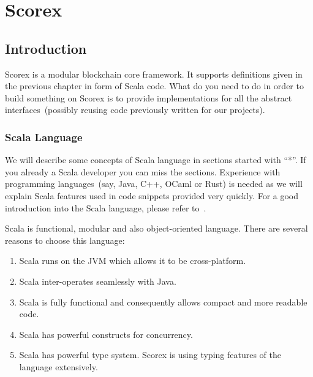 \documentclass[]{report}   %
\begin{document}
%
%
%
%
%

\chapter{Scorex}           
\label{impl}

\section{Introduction}     

Scorex is a modular blockchain core framework. It supports definitions given in the previous chapter in form of Scala code. What do you need to do in order to build something on Scorex is to provide implementations for all the abstract interfaces~(possibly reusing code previously written for our projects).

\subsection{Scala Language}

We will describe some concepts of Scala language in sections started with ``*''. If you already a Scala developer you can miss the sections. Experience with programming languages~(say, Java, C++, OCaml or Rust) is needed as we will explain Scala features used in code snippets provided very quickly. For a good introduction into the Scala language, please refer to~\cite{odersky2008programming}.

Scala is functional, modular and also object-oriented language. There are several reasons to choose this language:
\begin{enumerate}
	\item Scala runs on the JVM which allows it to be cross-platform.
	\item Scala inter-operates seamlessly with Java.
	\item Scala is fully functional and consequently allows compact and more readable code.
	\item Scala has powerful constructs for concurrency.
	\item Scala has powerful type system. Scorex is using typing features of the language extensively.
\end{enumerate}
\end{document}
